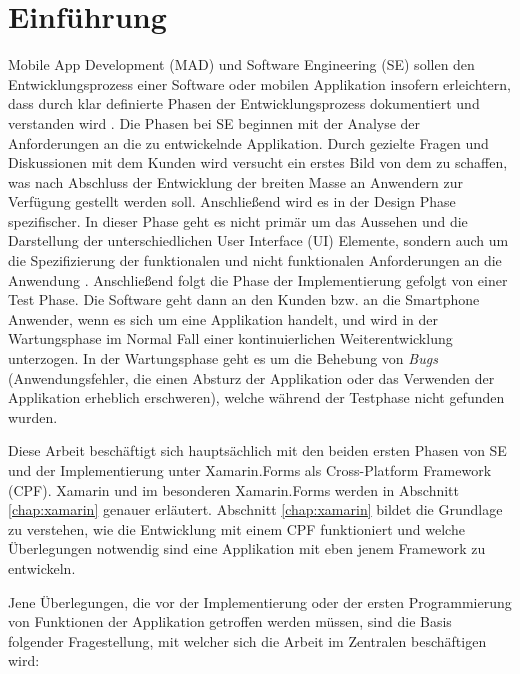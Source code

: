 %
%
% 
% 

\chapter{Einführung}
\label{chap:intro}
	Mobile App Development (MAD) und Software Engineering (SE) sollen den Entwicklungsprozess einer Software oder mobilen Applikation insofern erleichtern, dass durch klar definierte Phasen der Entwicklungsprozess dokumentiert und verstanden wird \cite{Anthony2010}. Die Phasen bei SE beginnen mit der Analyse der Anforderungen an die zu entwickelnde Applikation. Durch gezielte Fragen und Diskussionen mit dem Kunden wird versucht ein erstes Bild von dem zu schaffen, was nach Abschluss der Entwicklung der breiten Masse an Anwendern zur Verfügung gestellt werden soll. Anschließend wird es in der Design Phase spezifischer. In dieser Phase geht es nicht primär um das Aussehen und die Darstellung der unterschiedlichen User Interface (UI) Elemente, sondern auch um die Spezifizierung der funktionalen und nicht funktionalen Anforderungen an die Anwendung \cite{Anthony2010}. Anschließend folgt die Phase der Implementierung gefolgt von einer Test Phase. Die Software geht dann an den Kunden bzw. an die Smartphone Anwender, wenn es sich um eine Applikation handelt, und wird in der Wartungsphase im Normal Fall einer kontinuierlichen Weiterentwicklung unterzogen. In der Wartungsphase geht es um die Behebung von \textit{Bugs} (Anwendungsfehler, die einen Absturz der Applikation oder das Verwenden der Applikation erheblich erschweren), welche während der Testphase nicht gefunden wurden. 

	Diese Arbeit beschäftigt sich hauptsächlich mit den beiden ersten Phasen von SE und der Implementierung unter Xamarin.Forms als Cross-Platform Framework (CPF). Xamarin und im besonderen Xamarin.Forms werden in Abschnitt \ref{chap:xamarin} genauer erläutert. Abschnitt \ref{chap:xamarin} bildet die Grundlage zu verstehen, wie die Entwicklung mit einem CPF funktioniert und welche Überlegungen notwendig sind eine Applikation mit eben jenem Framework zu entwickeln.

	Jene Überlegungen, die vor der Implementierung oder der ersten Programmierung von Funktionen der Applikation getroffen werden müssen, sind die Basis folgender Fragestellung, mit welcher sich die Arbeit im Zentralen beschäftigen wird:\vspace{1cm}

